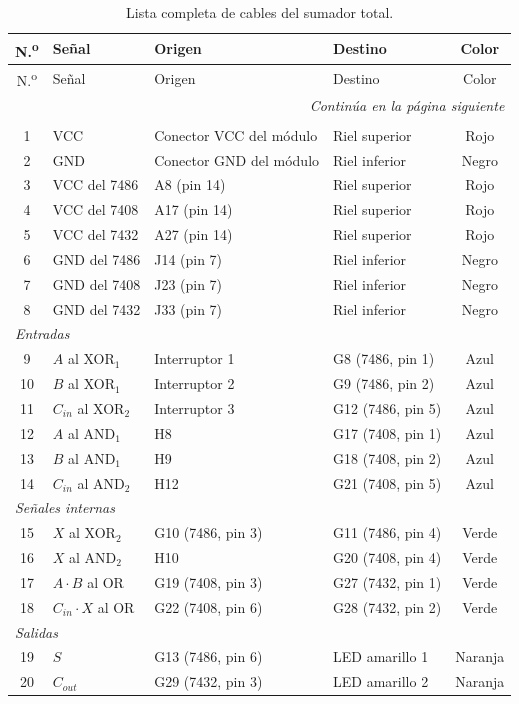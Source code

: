 \documentclass[10pt]{article}
\begin{document}
{\small
\begin{longtable}{clllc}
  \caption{Lista completa de cables del sumador total.}
  \label{tab:cables} \\
  \toprule
  N.\textsuperscript{o} & Señal & Origen & Destino & Color \\
  \midrule
  \endfirsthead
  \toprule
  N.\textsuperscript{o} & Señal & Origen & Destino & Color \\
  \midrule
  \endhead
  \midrule
  \multicolumn{5}{r}{\textit{Continúa en la página siguiente}} \\
  \endfoot
  \bottomrule
  \endlastfoot
  \multicolumn{5}{l}{\textit{Alimentación}} \\
  1  & VCC          & Conector VCC del módulo & Riel superior          & Rojo \\
  2  & GND          & Conector GND del módulo & Riel inferior          & Negro \\
  3  & VCC del 7486 & A8 (pin 14)  & Riel superior & Rojo \\
  4  & VCC del 7408 & A17 (pin 14) & Riel superior & Rojo \\
  5  & VCC del 7432 & A27 (pin 14) & Riel superior & Rojo \\
  6  & GND del 7486 & J14 (pin 7)  & Riel inferior & Negro \\
  7  & GND del 7408 & J23 (pin 7)  & Riel inferior & Negro \\
  8  & GND del 7432 & J33 (pin 7)  & Riel inferior & Negro \\
  \midrule
  \multicolumn{5}{l}{\textit{Entradas}} \\
  9  & $A$ al XOR$_1$      & Interruptor 1 & G8 (7486, pin 1)  & Azul \\
  10 & $B$ al XOR$_1$      & Interruptor 2 & G9 (7486, pin 2)  & Azul \\
  11 & $C_{in}$ al XOR$_2$ & Interruptor 3 & G12 (7486, pin 5) & Azul \\
  12 & $A$ al AND$_1$      & H8  & G17 (7408, pin 1) & Azul \\
  13 & $B$ al AND$_1$      & H9  & G18 (7408, pin 2) & Azul \\
  14 & $C_{in}$ al AND$_2$ & H12 & G21 (7408, pin 5) & Azul \\
  \midrule
  \multicolumn{5}{l}{\textit{Señales internas}} \\
  15 & $X$ al XOR$_2$      & G10 (7486, pin 3) & G11 (7486, pin 4) & Verde \\
  16 & $X$ al AND$_2$      & H10 & G20 (7408, pin 4) & Verde \\
  17 & $A \cdot B$ al OR   & G19 (7408, pin 3) & G27 (7432, pin 1) & Verde \\
  18 & $C_{in}\cdot X$ al OR & G22 (7408, pin 6) & G28 (7432, pin 2) & Verde \\
  \midrule
  \multicolumn{5}{l}{\textit{Salidas}} \\
  19 & $S$          & G13 (7486, pin 6) & LED amarillo 1 & Naranja \\
  20 & $C_{out}$    & G29 (7432, pin 3) & LED amarillo 2 & Naranja \\
\end{longtable}
}
\end{document}
